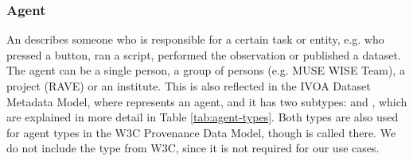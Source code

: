 %




\subsubsection{Agent}\label{sec:w3c-agent}

An  describes someone who is responsible for a certain task or
entity, e.g. who pressed a button, 
ran a script, performed the observation or published a dataset.
The agent can be a single person, a group of persons (e.g. MUSE WISE Team), a 
project (RAVE) or an institute. 
This is also reflected in the IVOA Dataset Metadata Model, where  
represents an agent, and it has two subtypes:  and ,
which are explained in more detail in Table \ref{tab:agent-types}.
Both types are also used for agent types in the W3C Provenance Data Model, though 
 is called  there. 
We do not include the type  from W3C, since it is not required for 
our use cases.

